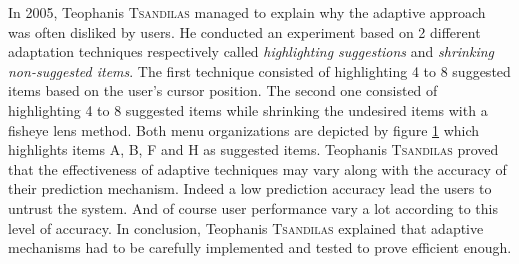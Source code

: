 In 2005, Teophanis \textsc{Tsandilas} \cite{tsandilas} managed to explain why 
the 
adaptive approach was often disliked by users. He conducted an experiment based 
on 2 different adaptation techniques respectively called \textit{highlighting 
suggestions} and \textit{shrinking non-suggested items}. The first technique 
consisted of highlighting 4 to 8 suggested items based on the user’s cursor 
position. The second one consisted of highlighting 4 to 8 suggested items while 
shrinking the undesired items with a fisheye lens method. Both menu 
organizations are depicted by figure \ref{fig:tsandilas_menus} which 
highlights items A, B, F and H as suggested items. Teophanis \textsc{Tsandilas} 
proved 
that the effectiveness of adaptive techniques may vary along with the accuracy 
of their prediction mechanism. Indeed a low prediction accuracy lead the users 
to untrust the system. And of course user performance vary a lot according to 
this level of accuracy. In conclusion, Teophanis \textsc{Tsandilas} explained 
that 
adaptive mechanisms had to be carefully implemented and tested to 
prove efficient enough.\newline

\begin{figure}[!ht]
    
    \label{fig:tsandilas_menus}
\end{figure}


